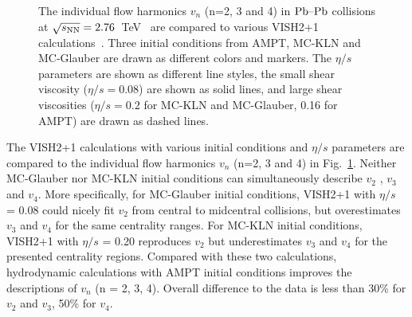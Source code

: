 \begin{figure}[h]
\begin{center}
        \caption{The individual flow harmonics $v_n$ (n=2, 3 and 4) in $\textnormal{Pb--Pb}$ collisions at $\sqrt{s_{\textnormal{NN}}}=2.76$~TeV~\cite{Adam:2016izf} are compared to various VISH2+1 calculations~\cite{Zhu:2016puf}. Three initial conditions from AMPT, MC-KLN and MC-Glauber are drawn as different colors and markers. The $\eta/s$ parameters are shown as different line styles, the small shear viscosity ($\eta/s=0.08$) are shown as solid lines, and large shear viscosities ($\eta/s=0.2$ for MC-KLN and MC-Glauber, 0.16 for AMPT) are drawn as dashed lines.}
        \label{fig:Figure_9}
              \end{center}
\end{figure}

The VISH2+1 calculations with various initial conditions and $\eta/s$ parameters are compared to the individual flow harmonics $v_n$ (n=2, 3 and 4) in Fig.~\ref{fig:Figure_9}.
Neither MC-Glauber nor MC-KLN initial conditions can simultaneously describe $v_2$ , $v_3$ and $v_4$. More specifically, for MC-Glauber initial conditions, VISH2+1 with $\eta/s$ = 0.08 could nicely fit $v_2$ from central to midcentral collisions, but overestimates $v_3$ and $v_4$ for the same centrality ranges. For MC-KLN initial conditions, VISH2+1 with $\eta/s$ = 0.20 reproduces $v_2$ but underestimates $v_3$ and $v_4$ for the presented centrality regions. Compared with these two calculations, hydrodynamic calculations with AMPT initial conditions improves the descriptions of $v_n$ (n = 2, 3, 4). Overall difference to the data is less than 30\% for $v_2$ and $v_3$,  50\% for $v_4$.


